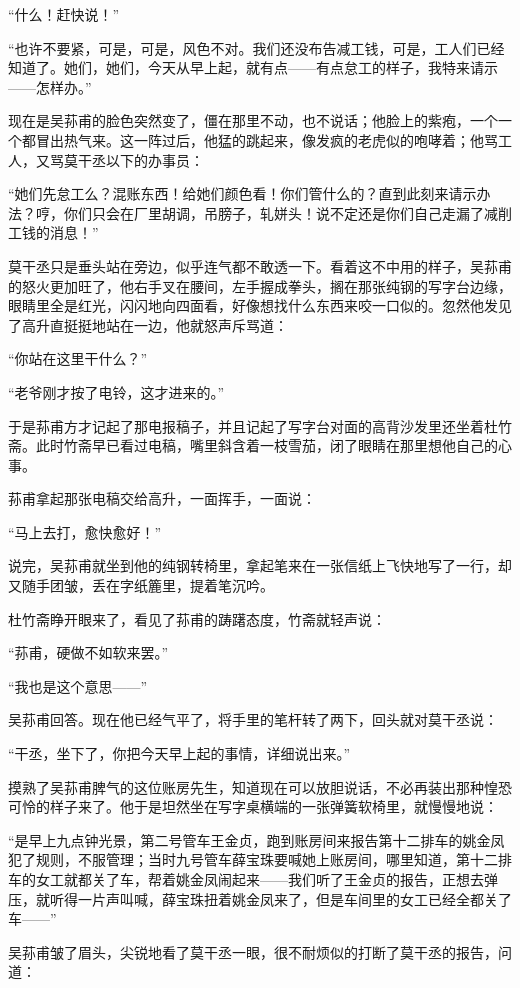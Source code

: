 \par “什么！赶快说！”
\par “也许不要紧，可是，可是，风色不对。我们还没布告减工钱，可是，工人们已经知道了。她们，她们，今天从早上起，就有点——有点怠工的样子，我特来请示——怎样办。”
\par 现在是吴荪甫的脸色突然变了，僵在那里不动，也不说话；他脸上的紫疱，一个一个都冒出热气来。这一阵过后，他猛的跳起来，像发疯的老虎似的咆哮着；他骂工人，又骂莫干丞以下的办事员：
\par “她们先怠工么？混账东西！给她们颜色看！你们管什么的？直到此刻来请示办法？哼，你们只会在厂里胡调，吊膀子，轧姘头！说不定还是你们自己走漏了减削工钱的消息！”
\par 莫干丞只是垂头站在旁边，似乎连气都不敢透一下。看着这不中用的样子，吴荪甫的怒火更加旺了，他右手叉在腰间，左手握成拳头，搁在那张纯钢的写字台边缘，眼睛里全是红光，闪闪地向四面看，好像想找什么东西来咬一口似的。忽然他发见了高升直挺挺地站在一边，他就怒声斥骂道：
\par “你站在这里干什么？”
\par “老爷刚才按了电铃，这才进来的。”
\par 于是荪甫方才记起了那电报稿子，并且记起了写字台对面的高背沙发里还坐着杜竹斋。此时竹斋早已看过电稿，嘴里斜含着一枝雪茄，闭了眼睛在那里想他自己的心事。
\par 荪甫拿起那张电稿交给高升，一面挥手，一面说：
\par “马上去打，愈快愈好！”
\par 说完，吴荪甫就坐到他的纯钢转椅里，拿起笔来在一张信纸上飞快地写了一行，却又随手团皱，丢在字纸簏里，提着笔沉吟。
\par 杜竹斋睁开眼来了，看见了荪甫的踌躇态度，竹斋就轻声说：
\par “荪甫，硬做不如软来罢。”
\par “我也是这个意思——”
\par 吴荪甫回答。现在他已经气平了，将手里的笔杆转了两下，回头就对莫干丞说：
\par “干丞，坐下了，你把今天早上起的事情，详细说出来。”
\par 摸熟了吴荪甫脾气的这位账房先生，知道现在可以放胆说话，不必再装出那种惶恐可怜的样子来了。他于是坦然坐在写字桌横端的一张弹簧软椅里，就慢慢地说：
\par “是早上九点钟光景，第二号管车王金贞，跑到账房间来报告第十二排车的姚金凤犯了规则，不服管理；当时九号管车薛宝珠要喊她上账房间，哪里知道，第十二排车的女工就都关了车，帮着姚金凤闹起来——我们听了王金贞的报告，正想去弹压，就听得一片声叫喊，薛宝珠扭着姚金凤来了，但是车间里的女工已经全都关了车——”
\par 吴荪甫皱了眉头，尖锐地看了莫干丞一眼，很不耐烦似的打断了莫干丞的报告，问道：

